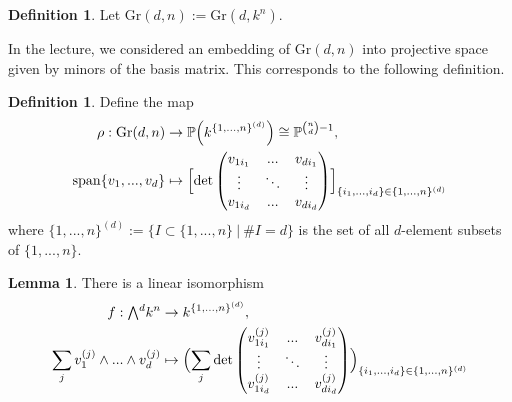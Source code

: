 \documentclass{scrartcl}
\newcommand{\Proj}{\mathbb{P}}
\newcommand{\Gr}{\mathrm{Gr}}
\newcommand{\extpow}{\mathchoice{{\textstyle\bigwedge}}
    {{\bigwedge}}
    {{\textstyle\wedge}}
    {{\scriptstyle\wedge}}}
\newcommand{\vspan}{\mathrm{span}}
\theoremstyle{definition}
\newtheorem{definition}[subsection]{Definition}
\newtheorem{lemma}[subsection]{Lemma}
\begin{document}
\begin{definition}
    Let $\Gr(d, n) := \Gr(d, k^n)$.
\end{definition}
In the lecture, we considered an embedding of $\Gr(d, n)$ into projective space given by minors of the basis matrix.
This corresponds to the following definition.
\begin{definition}
    Define the map
    \begin{align*}
        \rho: \Gr(d, n) &\to \Proj\Bigl(k^{\{1, ..., n\}^{(d)}}\Bigr) \cong \Proj^{{n \choose d} - 1}, \\
        \vspan\{v_1, ..., v_d\} &\mapsto \Bigl[ \det\left(\begin{matrix}
            v_{1i_1} & ... & v_{di_1} \\
            \vdots & \ddots & \vdots \\
            v_{1i_d} & ... & v_{di_d}
        \end{matrix}\right) \Bigr]_{\{i_1, ..., i_d\} \in \{1, ..., n\}^{(d)}}
    \end{align*}
    where $\{1, ..., n\}^{(d)} := \{ I \subset \{1, ..., n\} \ | \ \#I = d \}$ is the set of all $d$-element subsets of $\{1, ..., n\}$.
\end{definition}
\begin{lemma}
    \label{prop:isomorphism_extpow_det}
    There is a linear isomorphism
    \begin{align*}
        f: \extpow^d k^n &\to k^{\{1, ..., n\}^{(d)}}, \\
        \sum_j v_1^{(j)} \wedge ... \wedge v_d^{(j)} &\mapsto \Bigl( \sum_j \det\left(\begin{matrix}
            v_{1i_1}^{(j)} & ... & v_{di_1}^{(j)} \\
            \vdots & \ddots & \vdots \\
            v_{1i_d}^{(j)} & ... & v_{di_d}^{(j)}
        \end{matrix}\right) \Bigr)_{\{i_1, ..., i_d\} \in \{1, ..., n\}^{(d)}}
    \end{align*}
\end{lemma}
\end{document}
